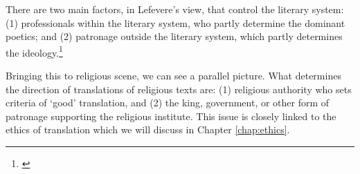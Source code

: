 There are two main factors, in Lefevere's view, that control the literary system: (1) professionals within the literary system, who partly determine the dominant poetics; and (2) patronage outside the literary system, which partly determines the ideology.\footnote{\citealp[p.~200]{munday:translation}}

Bringing this to religious scene, we can see a parallel picture. What determines the direction of translations of religious texts are: (1) religious authority who sets criteria of `good' translation, and (2) the king, government, or other form of patronage supporting the religious institute. This issue is closely linked to the ethics of translation which we will discuss in Chapter \ref{chap:ethics}.
